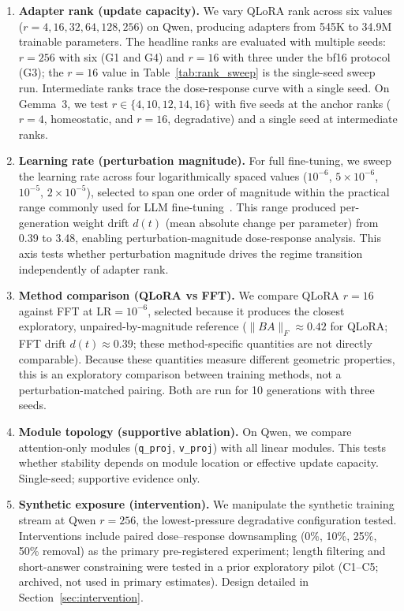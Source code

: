 \documentclass[a4paper,fleqn]{cas-dc}
\newif\ifshowchanges
\newcommand{\rev}[1]{\ifshowchanges{\color{blue}#1}\else{#1}\fi}
\begin{document}
\begin{enumerate}
\item \textbf{Adapter rank (update capacity).} We vary QLoRA rank across six
values ($r=4,16,32,64,128,256$) on Qwen, producing adapters from 545K to 34.9M
trainable parameters. The headline ranks are evaluated with multiple seeds: $r=256$ with six (G1 and G4) and $r=16$ with three under the bf16 protocol (G3); the $r=16$ value in Table~\ref{tab:rank_sweep} is the single-seed sweep run. Intermediate ranks trace the dose-response curve with a single seed. On Gemma~3, we test $r \in \{4,10,12,14,16\}$ with five seeds at the
anchor ranks ($r=4$, homeostatic, and $r=16$, degradative) and a single seed at intermediate ranks.

\item \textbf{Learning rate (perturbation magnitude).} For full fine-tuning, we
sweep the learning rate across four logarithmically spaced values ($10^{-6}$,
$5{\times}10^{-6}$, $10^{-5}$, $2{\times}10^{-5}$), selected to span one
order of magnitude within the practical range commonly used for LLM
fine-tuning~\citep{hu2022,dettmers2023}. This range produced per-generation
\rev{weight drift $d(t)$ (mean absolute change per parameter)} from 0.39 to 3.48, enabling perturbation-magnitude
dose-response analysis. This axis tests whether
perturbation magnitude drives the regime transition independently of adapter
rank.

\item \textbf{Method comparison (QLoRA vs FFT).} We compare QLoRA $r=16$
against FFT at $\mathrm{LR}=10^{-6}$, selected because it produces the closest
exploratory, unpaired-by-magnitude reference ($\|BA\|_F \approx 0.42$ for QLoRA; FFT drift $d(t) \approx 0.39$; these method-specific quantities are not directly comparable). \rev{Because these quantities measure different geometric properties, this is an exploratory comparison between training methods, not a perturbation-matched pairing.} Both
are run for 10 generations with three seeds.

\item \textbf{Module topology (supportive ablation).} On Qwen, we compare
attention-only modules (\texttt{q\_proj}, \texttt{v\_proj}) with all linear
modules. This tests whether stability depends on module location or effective
update capacity. Single-seed; supportive evidence only.

\item \textbf{Synthetic exposure (intervention).} We manipulate the synthetic
training stream at Qwen $r=256$, the lowest-pressure degradative configuration tested. Interventions include
paired dose--response downsampling (0\%, 10\%, 25\%, 50\%
removal) \rev{as the primary pre-registered experiment; length filtering and short-answer
constraining were tested in a prior exploratory pilot (C1--C5; archived, not used in primary estimates).}
Design detailed in Section~\ref{sec:intervention}.
\end{enumerate}
\end{document}
